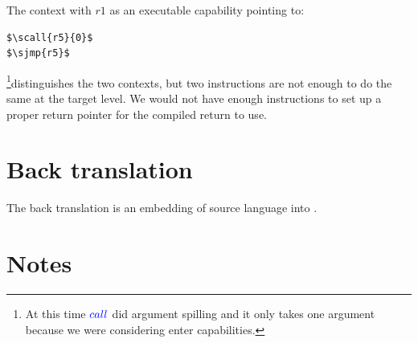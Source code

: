 \documentclass[a4paper]{article}
\newcommand{\sourcecolor}[1]{\color{blue}}
\newcommand{\src}[1]{{\sourcecolor{} #1}}
\newcommand{\zinstr}[1]{#1}
\newcommand{\oneinstr}[2]{
  \ifthenelse{\equal{#2}{}}
  {\zinstr{#1}}
  {\zinstr{#1} \; #2}
}
\newcommand{\twoinstr}[3]{
  \ifthenelse{\equal{#2#3}{}}
  {\zinstr{#1}}
  {\zinstr{#1} \; #2 \; #3}
}
\newcommand{\sjmp}[1]{\oneinstr{\src{jmp}}{#1}}
\newcommand{\scall}[2]{\twoinstr{\src{call}}{#1}{#2}}
\begin{document}
The context with $r1$ as an executable capability pointing to:
\begin{lstlisting}
$\scall{r5}{0}$
$\sjmp{r5}$
\end{lstlisting}
\footnote{At this time $\scall{}{}$ did argument spilling and it only takes one argument because we were considering enter capabilities.}distinguishes the two contexts, but two instructions are not enough to do the same at the target level. We would not have enough instructions to set up a proper return pointer for the compiled return to use.

\clearpage
\section{Back translation}
The back translation is an embedding of source language into .

\section{Notes}
\end{document}
